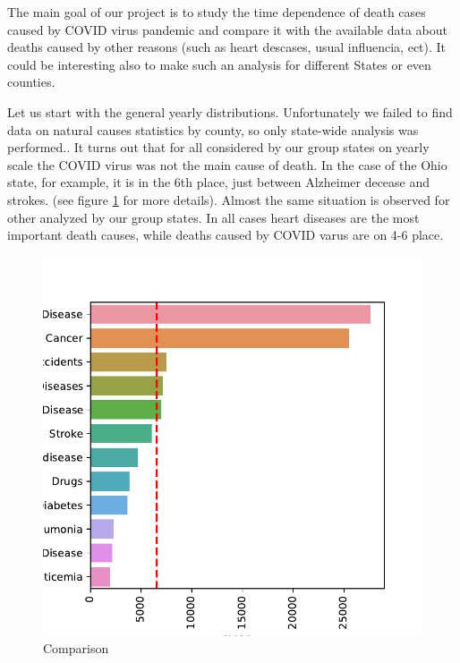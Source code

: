\documentclass[conference]{IEEEtran}
\begin{document}
The main goal of our project is to study the time dependence of death cases caused by COVID virus pandemic and compare it with the available data about deaths caused by other reasons (such as heart descases, usual influencia, ect). It could be interesting also to make such an analysis for different States or even counties.

Let us start with the general yearly distributions. Unfortunately we failed to find data on natural causes statistics by county, so only state-wide analysis was performed.. It turns out that for all considered by our group states on yearly scale the COVID virus was not the main cause of death. In the case of the Ohio state, for example, it is in the 6th place, just between Alzheimer decease and strokes. (see figure \ref{fig:yearly_deaths} for more details). Almost the same situation is observed for other analyzed by our group states. In all cases heart diseases are the most important death causes, while deaths caused by COVID varus are on 4-6 place.


\begin{figure}
  \centering
  \includegraphics[width=0.9\columnwidth]{figs/yearly_deaths}
  \caption{Comparison}
  \label{fig:yearly_deaths}
\end{figure}
\end{document}
